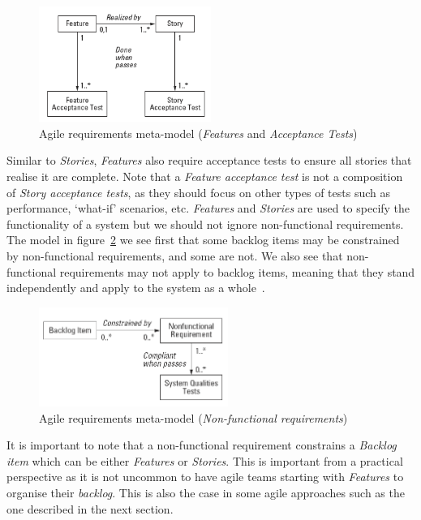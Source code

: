 \documentclass[dissertation,final]{softeng}
\begin{document}
\begin{figure}[h]
\includegraphics[width=0.50\textwidth]{metamodel_features_tests}
\centering
\caption{Agile requirements meta-model (\emph{Features} and \emph{Acceptance Tests})}
\label{fig:metamodel_features_tests}
\end{figure}

Similar to \emph{Stories}, \emph{Features} also require acceptance tests to ensure all stories that realise it are complete. Note that a \emph{Feature acceptance test} is not a composition of \emph{Story acceptance tests}, as they should focus on other types of tests such as performance, `what-if' scenarios, etc. \emph{Features} and \emph{Stories} are used to specify the functionality of a system but we should not ignore non-functional requirements. The model in figure~\ref{fig:metamodel_nfrs} we see first that some backlog items may be constrained by non-functional requirements, and some are not. We also see that non-functional requirements may not apply to backlog items, meaning that they stand independently and apply to the system as a whole~\citep{Leffingwell2011}.

\begin{figure}[h]
\includegraphics[width=0.55\textwidth]{metamodel_nfrs}
\centering
\caption{Agile requirements meta-model (\emph{Non-functional requirements})}
\label{fig:metamodel_nfrs}
\end{figure}

It is important to note that a non-functional requirement constrains a \emph{Backlog item} which can be either \emph{Features} or \emph{Stories}. This is important from a practical perspective as it is not uncommon to have agile teams starting with \emph{Features} to organise their \emph{backlog}. This is also the case in some agile approaches such as the one described in the next section.
\end{document}
